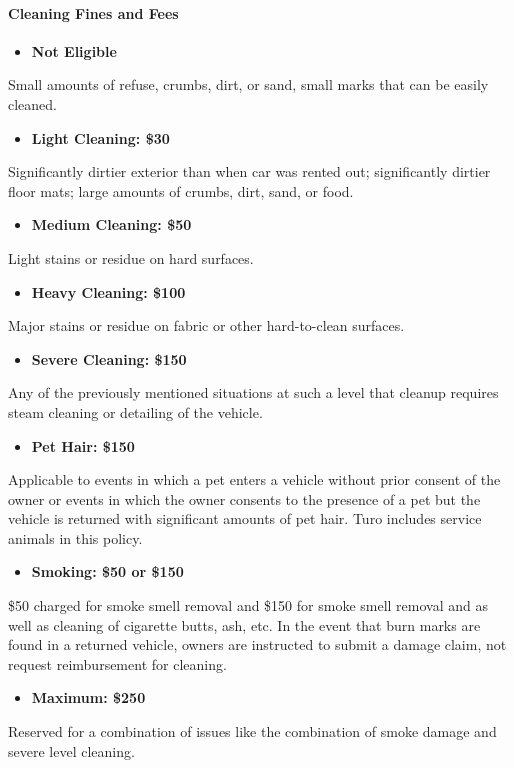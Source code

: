 \documentclass[review,12pt]{elsarticle}
\begin{document}
    \paragraph{Cleaning Fines and Fees}
    \begin{itemize}
      \item \textbf{Not Eligible}
    \end{itemize}
      Small amounts of refuse, crumbs, dirt, or sand, small marks that can be easily cleaned.
    \begin{itemize}
      \item \textbf{Light Cleaning: \$30}
    \end{itemize}
      Significantly dirtier exterior than when car was rented out; significantly dirtier floor mats; large amounts of crumbs, dirt, sand, or food.
    \begin{itemize}
      \item \textbf{Medium Cleaning: \$50}
    \end{itemize}
      Light stains or residue on hard surfaces.
    \begin{itemize}
      \item \textbf{Heavy Cleaning: \$100}
    \end{itemize}
      Major stains or residue on fabric or other hard-to-clean surfaces.
    \begin{itemize}
      \item \textbf{Severe Cleaning: \$150}
    \end{itemize}
      Any of the previously mentioned situations at such a level that cleanup requires steam cleaning or detailing of the vehicle.
    \begin{itemize}
      \item \textbf{Pet Hair: \$150}
    \end{itemize}
      Applicable to events in which a pet enters a vehicle without prior consent of the owner or events in which the owner consents to the presence of a pet but the vehicle is returned with significant amounts of pet hair. Turo includes service animals in this policy.
    \begin{itemize}
      \item \textbf{Smoking: \$50 or \$150}
    \end{itemize}
      \$50 charged for smoke smell removal and \$150 for smoke smell removal and as well as cleaning of cigarette butts, ash, etc. In the event that burn marks are found in a returned vehicle, owners are instructed to submit a damage claim, not request reimbursement for cleaning.
    \begin{itemize}
      \item \textbf{Maximum: \$250}
    \end{itemize}
      Reserved for a combination of issues like the combination of smoke damage and severe level cleaning.
\end{document}
